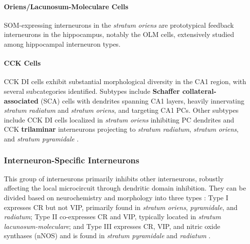 \documentclass[../main.tex]{subfiles}
\begin{document}
\paragraph{Oriens/Lacunosum-Moleculare Cells}
SOM-expressing interneurons in the \textit{stratum oriens} are prototypical feedback interneurons in the hippocampus, notably the OLM cells, extensively studied among hippocampal interneuron types.

\paragraph{CCK Cells}
CCK DI cells exhibit substantial morphological diversity in the CA1 region, with several subcategories identified.
Subtypes include \textbf{Schaffer collateral-associated} (SCA) cells with dendrites spanning CA1 layers, heavily innervating \textit{stratum radiatum} and \textit{stratum oriens}, and targeting CA1 PCs.
Other subtypes include CCK DI cells localized in \textit{stratum oriens} inhibiting PC dendrites and CCK \textbf{trilaminar} interneurons projecting to \textit{stratum radiatum}, \textit{stratum oriens}, and \textit{stratum pyramidale} \citep{pawelzik2002physiological}.

\subsubsection{Interneuron-Specific Interneurons}
This group of interneurons primarily inhibits other interneurons, robustly affecting the local microcircuit through dendritic domain inhibition.
They can be divided based on neurochemistry and morphology into three types \citep{tyan_dendritic_2014}: Type I expresses CR but not VIP, primarily found in \textit{stratum oriens}, \textit{pyramidale}, and \textit{radiatum}; Type II co-expresses CR and VIP, typically located in \textit{stratum lacunosum-moleculare}; and Type III expresses CR, VIP, and nitric oxide synthases (nNOS) and is found in \textit{stratum pyramidale} and \textit{radiatum} \citep{tyan_dendritic_2014, booker_morphological_2018}.
\end{document}
